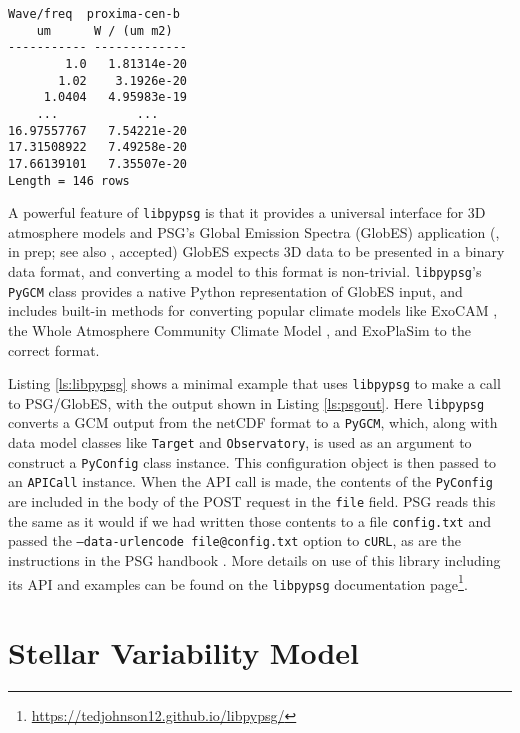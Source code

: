 \documentclass[linenumbers,5p,twocolumn,authoryear]{elsarticle}
\newcommand{\urldocslibpypsg}{\url{https://tedjohnson12.github.io/libpypsg/}}
\begin{document}
\begin{lstlisting}[caption={\texttt{libpypsg} Example Output},label={ls:psgout}]
Wave/freq  proxima-cen-b
    um      W / (um m2) 
----------- -------------
        1.0   1.81314e-20
       1.02    3.1926e-20
     1.0404   4.95983e-19
    ...           ...
16.97557767   7.54221e-20
17.31508922   7.49258e-20
17.66139101   7.35507e-20
Length = 146 rows

\end{lstlisting}



A powerful feature of \texttt{libpypsg} is that it provides a universal interface for 3D atmosphere models and PSG's Global Emission Spectra (GlobES) application (\citealt{fauchez2024}, in prep; see also \citealt{kofman2024}, accepted)
GlobES expects 3D data to be presented in a binary data format, and converting a model to this format is non-trivial. \texttt{libpypsg}'s \texttt{PyGCM} class provides a native Python representation of GlobES input, and includes built-in methods for converting popular climate models like ExoCAM \citep{wolf2022}, the Whole Atmosphere Community Climate Model \citep[WACCM,][]{marsh2013}, and ExoPlaSim \citep{paradise2022} to the correct format.

Listing \ref{ls:libpypsg} shows a minimal example that uses \texttt{libpypsg} to make a call to PSG/GlobES, with the output shown in Listing \ref{ls:psgout}. Here \texttt{libpypsg} converts a GCM output from the netCDF format to a \texttt{PyGCM}, which, along with data model classes like \texttt{Target} and \texttt{Observatory}, is used as an argument to construct a \texttt{PyConfig} class instance. This configuration object is then passed to an \texttt{APICall} instance. When the API call is made, the contents of the \texttt{PyConfig} are included in the body of the POST request in the \texttt{file} field. PSG reads this the same as it would if we had written those contents to a file \texttt{config.txt} and passed the \texttt{--data-urlencode file@config.txt} option to \texttt{cURL}, as are the instructions in the PSG handbook \citep[pp. 162-163]{villanueva2022}. More details on use of this library including its API and examples can be found on the \texttt{libpypsg} documentation page\footnote{\urldocslibpypsg}.


\section{Stellar Variability Model}
\label{sec:star}
\end{document}
